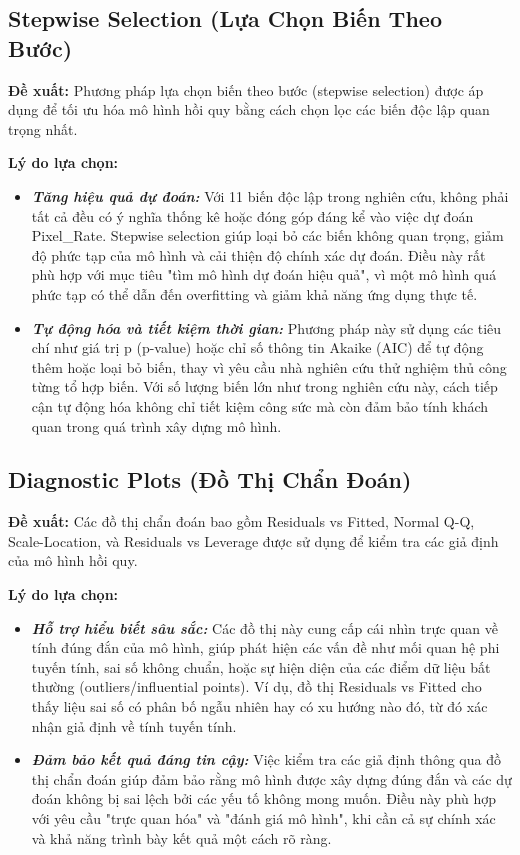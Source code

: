 \subsection{Stepwise Selection (Lựa Chọn Biến Theo Bước)}

\textbf{Đề xuất:} Phương pháp lựa chọn biến theo bước (stepwise selection) được áp dụng để tối ưu hóa mô hình hồi quy bằng cách chọn lọc các biến độc lập quan trọng nhất.

\textbf{Lý do lựa chọn:}

\begin{itemize}
    \item \textbf{\textit{Tăng hiệu quả dự đoán:}} Với 11 biến độc lập trong nghiên cứu, không phải tất cả đều có ý nghĩa thống kê hoặc đóng góp đáng kể vào việc dự đoán Pixel\_Rate. Stepwise selection giúp loại bỏ các biến không quan trọng, giảm độ phức tạp của mô hình và cải thiện độ chính xác dự đoán. Điều này rất phù hợp với mục tiêu "tìm mô hình dự đoán hiệu quả", vì một mô hình quá phức tạp có thể dẫn đến overfitting và giảm khả năng ứng dụng thực tế.
    \item \textbf{\textit{Tự động hóa và tiết kiệm thời gian:}} Phương pháp này sử dụng các tiêu chí như giá trị p (p-value) hoặc chỉ số thông tin Akaike (AIC) để tự động thêm hoặc loại bỏ biến, thay vì yêu cầu nhà nghiên cứu thử nghiệm thủ công từng tổ hợp biến. Với số lượng biến lớn như trong nghiên cứu này, cách tiếp cận tự động hóa không chỉ tiết kiệm công sức mà còn đảm bảo tính khách quan trong quá trình xây dựng mô hình.
\end{itemize}



\subsection{Diagnostic Plots (Đồ Thị Chẩn Đoán)}

\textbf{Đề xuất:} Các đồ thị chẩn đoán bao gồm Residuals vs Fitted, Normal Q-Q, Scale-Location, và Residuals vs Leverage được sử dụng để kiểm tra các giả định của mô hình hồi quy.

\textbf{Lý do lựa chọn:}

\begin{itemize}
    \item \textbf{\textit{Hỗ trợ hiểu biết sâu sắc:}} Các đồ thị này cung cấp cái nhìn trực quan về tính đúng đắn của mô hình, giúp phát hiện các vấn đề như mối quan hệ phi tuyến tính, sai số không chuẩn, hoặc sự hiện diện của các điểm dữ liệu bất thường (outliers/influential points). Ví dụ, đồ thị Residuals vs Fitted cho thấy liệu sai số có phân bố ngẫu nhiên hay có xu hướng nào đó, từ đó xác nhận giả định về tính tuyến tính.
    \item \textbf{\textit{Đảm bảo kết quả đáng tin cậy:}} Việc kiểm tra các giả định thông qua đồ thị chẩn đoán giúp đảm bảo rằng mô hình được xây dựng đúng đắn và các dự đoán không bị sai lệch bởi các yếu tố không mong muốn. Điều này phù hợp với yêu cầu "trực quan hóa" và "đánh giá mô hình", khi cần cả sự chính xác và khả năng trình bày kết quả một cách rõ ràng.
\end{itemize}


